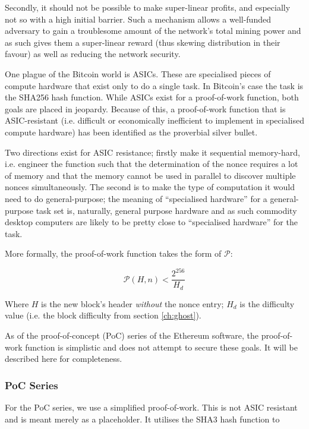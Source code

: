 \documentclass[9pt,oneside]{amsart}
\begin{document}
\begin{multicols}{2}
Secondly, it should not be possible to make super-linear profits, and especially not so with a high initial barrier. Such a mechanism allows a well-funded adversary to gain a troublesome amount of the network's total mining power and as such gives them a super-linear reward (thus skewing distribution in their favour) as well as reducing the network security.

One plague of the Bitcoin world is ASICs. These are specialised pieces of compute hardware that exist only to do a single task. In Bitcoin's case the task is the SHA256 hash function. While ASICs exist for a proof-of-work function, both goals are placed in jeopardy. Because of this, a proof-of-work function that is ASIC-resistant (i.e. difficult or economically inefficient to implement in specialised compute hardware) has been identified as the proverbial silver bullet.

Two directions exist for ASIC resistance; firstly make it sequential memory-hard, i.e. engineer the function such that the determination of the nonce requires a lot of memory and that the memory cannot be used in parallel to discover multiple nonces simultaneously. The second is to make the type of computation it would need to do general-purpose; the meaning of ``specialised hardware''  for a general-purpose task set is, naturally, general purpose hardware and as such commodity desktop computers are likely to be pretty close to ``specialised hardware'' for the task.

More formally, the proof-of-work function takes the form of $\mathcal{P}$:

\begin{equation}
\mathcal{P}(H, n) < \frac{2^{256}}{H_d}
\end{equation}

Where $H$ is the new block's header \textit{without} the nonce entry; $H_d$ is the difficulty value (i.e. the block difficulty from section \ref{ch:ghost}).

As of the proof-of-concept (PoC) series of the Ethereum software, the proof-of-work function is simplistic and does not attempt to secure these goals. It will be described here for completeness.

\subsubsection{PoC Series}

For the PoC series, we use a simplified proof-of-work. This is not ASIC resistant and is meant merely as a placeholder. It utilises the SHA3 hash function to


\end{multicols}
\end{document}
